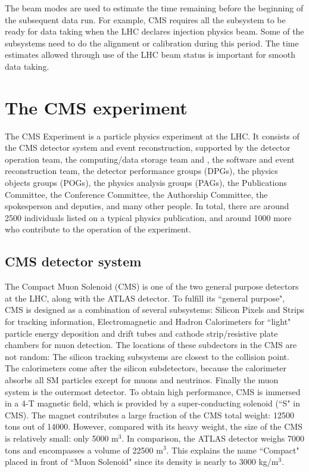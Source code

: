 The beam modes are used to estimate the time remaining before the beginning of the subsequent data run. For example, CMS requires all the subsystem to be ready for data taking when the LHC declares injection physics beam. Some of the subsystems need to do the alignment or calibration during this period. The time estimates allowed through use of the LHC beam status is important for smooth data taking.

\section{The CMS experiment}

The CMS Experiment is a particle physics experiment at the LHC. It consists of the CMS detector system and event reconstruction, supported by the detector operation team, the computing/data storage team and , the software and event reconstruction team, the detector performance groups (DPGs), the physics objects groups (POGs), the physics analysis groups (PAGs), the Publications Committee, the Conference Committee, the Authorship Committee, the spokesperson and deputies, and many other people.  In total, there are around 2500 individuals listed on a typical physics publication, and around 1000 more who contribute to the operation of the experiment.

\subsection{CMS detector system}

The Compact Muon Solenoid (CMS) is one of the two general purpose detectors at the LHC, along with the ATLAS detector. To fulfill its ``general purpose", CMS is designed as a combination of several subsystems: Silicon Pixels and Strips for tracking information, Electromagnetic and Hadron Calorimeters for ``light" particle energy deposition and drift tubes and cathode strip/resistive plate chambers for muon detection. The locations of these subdectors in the CMS are not random: The silicon tracking subsystems are closest to the collision point. The calorimeters come after the silicon subdetectors, because the calorimeter absorbs all SM particles except for muons and neutrinos. Finally the muon system is the outermost detector. To obtain high performance, CMS is immersed in a 4-T magnetic field, which is provided by a super-conducting solenoid (``S" in CMS). The magnet contributes a large fraction of the CMS total weight: 12500 tons out of 14000. However, compared with its heavy weight, the size of the CMS is relatively small: only 5000 m$^{3}$. In comparison, the ATLAS detector weighs 7000 tons and encompasses a volume of 22500 m$^{3}$. This explains the name ``Compact" placed in front of ``Muon Solenoid" since its density is nearly to 3000 kg/m$^{3}$.

